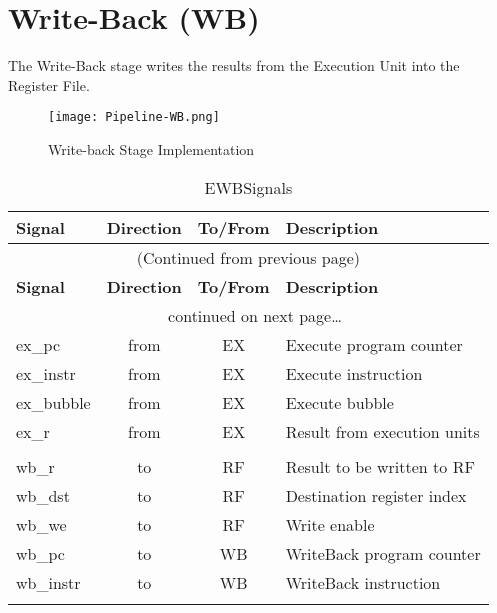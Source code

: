 \pagebreak

\section{Write-Back (WB)}\label{write-back-wb-1}

The Write-Back stage writes the results from the Execution Unit into the Register File.

\begin{figure}[h]
  \texttt{[image: Pipeline-WB.png]}
  \caption{Write-back Stage Implementation}
\end{figure}

\begin{longtable}[]{@{}lccl@{}}
	\toprule
	\textbf{Signal} & \textbf{Direction} & \textbf{To/From} & \textbf{Description}\tabularnewline
	\midrule
	\endfirsthead
	\multicolumn{4}{c}{{(Continued from previous page)}} \\
	\toprule
	\textbf{Signal} & \textbf{Direction} & \textbf{To/From} & \textbf{Description}\tabularnewline
	\midrule
	\endhead
	\midrule \multicolumn{4}{c}{{\tablename\ \thetable{} continued on next page\ldots}} \\
	\endfoot
	\endlastfoot
	
		ex\_pc & from & EX & Execute program counter\\
		ex\_instr & from & EX & Execute instruction\\
		ex\_bubble & from & EX & Execute bubble\\
		ex\_r & from  & EX & Result from execution units\\
		 &  &  & \\
		wb\_r & to & RF & Result to be written to RF\\
		wb\_dst & to & RF & Destination register index\\
		wb\_we & to & RF & Write enable\\
		wb\_pc & to & WB & WriteBack program counter\\
		wb\_instr & to & WB & WriteBack instruction\\

	\bottomrule
	\caption{EWBSignals}
	\label{tab:wb-signals}
\end{longtable}


